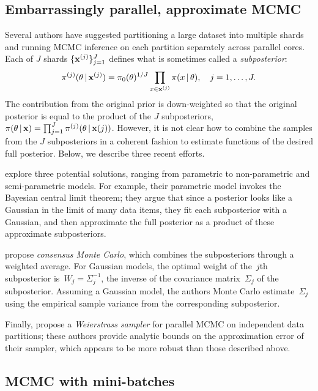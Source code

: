 \documentclass[angelino.tex]{subfiles}
\begin{document}
\subsection{Embarrassingly parallel, approximate MCMC}

Several authors have suggested partitioning a large dataset into multiple shards
and running MCMC inference on each partition separately across parallel cores.
Each of $J$ shards $\{\mathbf{x}^{(j)}\}_{j=1}^J$ defines what is sometimes called
a \emph{subposterior}:
\[
\pi^{(j)}(\theta \,|\, \mathbf{x}^{(j)})
= \pi_0(\theta)^{1/J} \prod_{x \in \mathbf{x}^{(j)}} \pi(x \,|\, \theta),
\quad j = 1, \dots, J.
\]
The contribution from the original prior is down-weighted so that
the original posterior is equal to the product of the $J$ subposteriors, \ie
$\pi(\theta \,|\, \mathbf{x}) = \prod_{j=1}^J \pi^{(j)}(\theta \,|\, \mathbf{x}{(j)})$.
However, it is not clear how to combine the samples from the $J$ subposteriors
in a coherent fashion to estimate functions of the desired full posterior.
Below, we describe three recent efforts.

\citet{neiswanger-2013-ep} explore three potential solutions, ranging from
parametric to non-parametric and semi-parametric models.
For example, their parametric model invokes the Bayesian central limit theorem;
they argue that since a posterior looks like a Gaussian in the limit of many
data items, they fit each subposterior with a Gaussian, and then approximate the
full posterior as a product of these approximate subposteriors.

\citet{scott-2013-consensus} propose \emph{consensus Monte Carlo}, 
which combines the subposteriors through a weighted average.
For Gaussian models, the optimal weight of the~$j$th subposterior
is~$W_j = \Sigma_j^{-1}$, the inverse of the covariance matrix~$\Sigma_j$
of the subposterior.
Assuming a Gaussian model, the authors Monte Carlo estimate~$\Sigma_j$ using
the empirical sample variance from the corresponding subposterior.

Finally, \citet{dunson:2013-weierstrass} propose a \emph{Weierstrass sampler}
for parallel MCMC on independent data partitions; these authors provide analytic
bounds on the approximation error of their sampler, which appears to be more
robust than those described above.

\subsection{MCMC with mini-batches}
\end{document}
